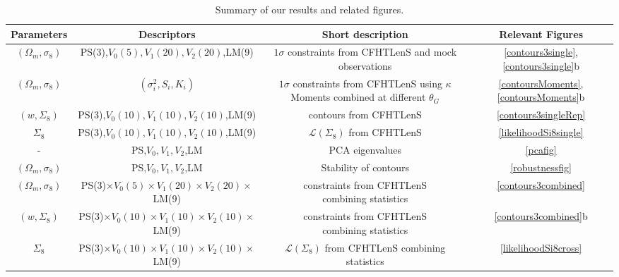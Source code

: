 \documentclass[reprint,aps,prd,superscriptaddress,showkeys,showpacs]{revtex4-1}
\begin{document}
\begin{table*}
\begin{tabular}{c|c|c||c}
Parameters & Descriptors & Short description & Relevant Figures \\ \hline \hline
$(\Omega_m,\sigma_8)$ & PS(3),$V_0(5),V_1(20),V_2(20)$,LM(9) &\pbox{20cm}{$1\sigma$ constraints from CFHTLenS \\ and mock observations}  & \ref{contours3single},\ref{contours3single}b \\ \hline
$(\Omega_m,\sigma_8)$ & $(\sigma_i^2,S_i,K_i)$ & \pbox{20cm}{$1\sigma$ constraints from CFHTLenS \\ using $\kappa$ Moments \\ combined at different $\theta_G$}  & \ref{contoursMoments},\ref{contoursMoments}b \\ \hline
$(w,\Sigma_8)$ & PS(3),$V_0(10),V_1(10),V_2(10)$,LM(9) & contours from CFHTLenS & \ref{contours3singleRep} \\ \hline 
$\Sigma_8$ & PS(3),$V_0(10),V_1(10),V_2(10)$,LM(9) & $\mathcal{L}(\Sigma_8)$ from CFHTLenS & \ref{likelihoodSi8single} \\ \hline
- & PS,$V_0,V_1,V_2$,LM & PCA eigenvalues  & \ref{pcafig} \\ \hline
$(\Omega_m,\sigma_8)$ & PS,$V_0,V_1,V_2$,LM & Stability of contours & \ref{robustnessfig} \\ \hline 
$(\Omega_m,\sigma_8)$ & PS(3)$\times V_0(5)\times V_1(20)\times V_2(20)\times$LM(9) & \pbox{20cm}{constraints from CFHTLenS \\ combining statistics} & \ref{contours3combined} \\ \hline
$(w,\Sigma_8)$ & PS(3)$\times V_0(10)\times V_1(10)\times V_2(10)\times$LM(9) & \pbox{20cm}{constraints from CFHTLenS \\ combining statistics} & \ref{contours3combined}b \\ \hline 
$\Sigma_8$ & PS(3)$\times V_0(10)\times V_1(10)\times V_2(10)\times$LM(9) & \pbox{20cm}{$\mathcal{L}(\Sigma_8)$ from CFHTLenS \\ combining statistics} & \ref{likelihoodSi8cross} \\ \hline
\end{tabular}
\caption{Summary of our results and related figures.}
\label{summarytable}
\end{table*}
%
\end{document}

